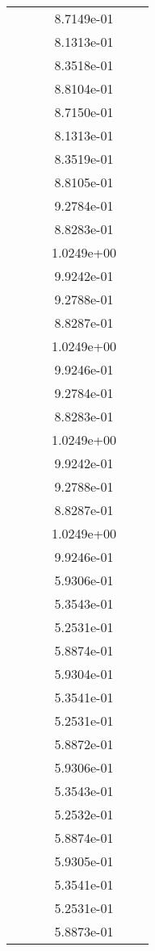 \begin{xltabular}{\textwidth}{r|rS[table-format=1.3e+2]S[table-format=1.4e+2]S[table-format=1.4e+2]S[table-format=-1.5]}
&  &  & 8.7149e-01 & & \\
&  &  & 8.1313e-01 & & \\
&  &  & 8.3518e-01 & & \\
&  &  & 8.8104e-01 & & \\
&  &  & 8.7150e-01 & & \\
&  &  & 8.1313e-01 & & \\
&  &  & 8.3519e-01 & & \\
&  &  & 8.8105e-01 & & \\
&  &  & 9.2784e-01 & & \\
&  &  & 8.8283e-01 & & \\
&  &  & 1.0249e+00 & & \\
&  &  & 9.9242e-01 & & \\
&  &  & 9.2788e-01 & & \\
&  &  & 8.8287e-01 & & \\
&  &  & 1.0249e+00 & & \\
&  &  & 9.9246e-01 & & \\
&  &  & 9.2784e-01 & & \\
&  &  & 8.8283e-01 & & \\
&  &  & 1.0249e+00 & & \\
&  &  & 9.9242e-01 & & \\
&  &  & 9.2788e-01 & & \\
&  &  & 8.8287e-01 & & \\
&  &  & 1.0249e+00 & & \\
&  &  & 9.9246e-01 & & \\
&  &  & 5.9306e-01 & & \\
&  &  & 5.3543e-01 & & \\
&  &  & 5.2531e-01 & & \\
&  &  & 5.8874e-01 & & \\
&  &  & 5.9304e-01 & & \\
&  &  & 5.3541e-01 & & \\
&  &  & 5.2531e-01 & & \\
&  &  & 5.8872e-01 & & \\
&  &  & 5.9306e-01 & & \\
&  &  & 5.3543e-01 & & \\
&  &  & 5.2532e-01 & & \\
&  &  & 5.8874e-01 & & \\
&  &  & 5.9305e-01 & & \\
&  &  & 5.3541e-01 & & \\
&  &  & 5.2531e-01 & & \\
&  &  & 5.8873e-01 & & \\

\end{xltabular}
